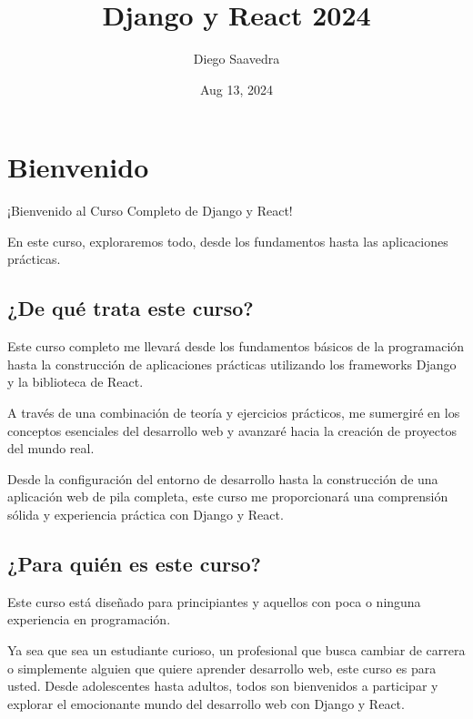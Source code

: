 \documentclass[
  a4paper,
  DIV=11,
  numbers=noendperiod,
  onepage,
  openany]{scrreprt}
\title{Django y React 2024}
\author{Diego Saavedra}
\date{Aug 13, 2024}
\renewcommand*\contentsname{Table of contents}
\newcommand\contentsname{Table of contents}
\begin{document}
\maketitle

\renewcommand*\contentsname{Table of contents}
{
\hypersetup{linkcolor=}
\setcounter{tocdepth}{2}
\tableofcontents
}


\chapter{Bienvenido}\label{bienvenido}

¡Bienvenido al Curso Completo de Django y React!

En este curso, exploraremos todo, desde los fundamentos hasta las
aplicaciones prácticas.

\section{¿De qué trata este curso?}\label{de-quuxe9-trata-este-curso}

Este curso completo me llevará desde los fundamentos básicos de la
programación hasta la construcción de aplicaciones prácticas utilizando
los frameworks Django y la biblioteca de React.

A través de una combinación de teoría y ejercicios prácticos, me
sumergiré en los conceptos esenciales del desarrollo web y avanzaré
hacia la creación de proyectos del mundo real.

Desde la configuración del entorno de desarrollo hasta la construcción
de una aplicación web de pila completa, este curso me proporcionará una
comprensión sólida y experiencia práctica con Django y React.

\section{¿Para quién es este curso?}\label{para-quiuxe9n-es-este-curso}

Este curso está diseñado para principiantes y aquellos con poca o
ninguna experiencia en programación.

Ya sea que sea un estudiante curioso, un profesional que busca cambiar
de carrera o simplemente alguien que quiere aprender desarrollo web,
este curso es para usted. Desde adolescentes hasta adultos, todos son
bienvenidos a participar y explorar el emocionante mundo del desarrollo
web con Django y React.
\end{document}
